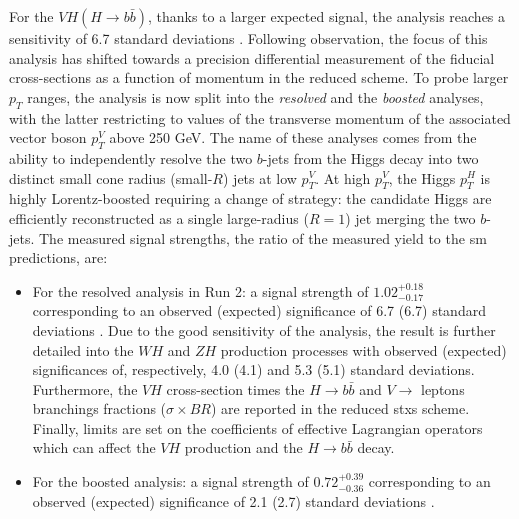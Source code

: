 For the $VH (H\rightarrow b\bar{b})$, thanks to a larger expected signal, the analysis reaches a sensitivity of 6.7 standard deviations \cite{ATLAS:2020fcp}. Following observation, the focus of this analysis has shifted towards a precision differential measurement of the fiducial cross-sections as a function of momentum in the reduced  scheme. To probe larger $p_T$ ranges, the analysis is now split into the \textit{resolved} \cite{ATLAS:2020fcp} and the \textit{boosted} \cite{ATLAS:2020jwz} analyses, with the latter restricting to values of the transverse momentum of the associated vector boson $p_T^V$ above 250 GeV. The name of these analyses comes from the ability to independently resolve the two $b$-jets from the Higgs decay into two distinct small cone radius (small-$R$) jets at low $p_T^V$. At high $p_T^V$, the Higgs $p_T^H$ is highly Lorentz-boosted requiring a change of strategy: the candidate Higgs are efficiently reconstructed as a single large-radius ($R = 1$) jet merging the two $b$-jets. The measured signal strengths, the ratio of the measured yield to the \gls{sm} predictions, are: 
\begin{itemize}
\item For the resolved analysis in Run 2: a signal strength of $1.02_{-0.17}^{+0.18}$ corresponding to an observed (expected) significance of 6.7 (6.7) standard deviations \cite{ATLAS:2020fcp}. Due to the good sensitivity of the analysis, the result is further detailed into the $WH$ and $ZH$ production processes with observed (expected) significances of, respectively, 4.0 (4.1) and 5.3 (5.1) standard deviations. Furthermore, the $VH$ cross-section times the $H \rightarrow b\bar{b}$ and $V\rightarrow$ leptons branchings fractions ($\sigma \times BR$) are reported in the reduced \gls{stxs} scheme. Finally, limits are set on the coefficients of effective Lagrangian operators which can affect the $VH$ production and the $H \rightarrow b\bar{b}$ decay.
\item For the boosted analysis: a signal strength of  $0.72_{-0.36}^{+0.39}$ corresponding to an observed (expected) significance of 2.1 (2.7) standard deviations \cite{ATLAS:2020jwz}.
\end{itemize}

